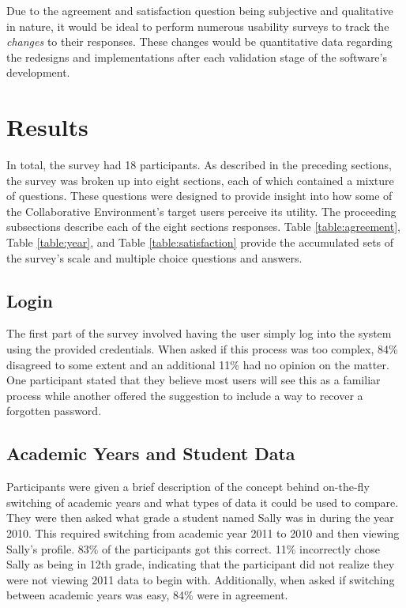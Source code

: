 Due to the agreement and satisfaction question being subjective and qualitative in nature, it would be ideal to perform numerous usability surveys to track the \emph{changes} to their responses. These changes would be quantitative data regarding the redesigns and implementations after each validation stage of the software's development.

\section{Results}
In total, the survey had 18 participants. As described in the preceding sections, the survey was broken up into eight sections, each of which contained a mixture of questions. These questions were designed to provide insight into how some of the Collaborative Environment's target users perceive its utility. The proceeding subsections describe each of the eight sections responses. Table \ref{table:agreement}, Table \ref{table:year}, and Table \ref{table:satisfaction} provide the accumulated sets of the survey's scale and multiple choice questions and answers.

\subsection*{Login}
The first part of the survey involved having the user simply log into the system using the provided credentials. When asked if this process was too complex, 84\% disagreed to some extent and an additional 11\% had no opinion on the matter. One participant stated that they believe most users will see this as a familiar process while another offered the suggestion to include a way to recover a forgotten password.

\subsection*{Academic Years and Student Data}
Participants were given a brief description of the concept behind on-the-fly switching of academic years and what types of data it could be used to compare. They were then asked what grade a student named Sally was in during the year 2010. This required switching from academic year 2011 to 2010 and then viewing Sally's profile. 83\% of the participants got this correct. 11\% incorrectly chose Sally as being in 12th grade, indicating that the participant did not realize they were not viewing 2011 data to begin with. Additionally, when asked if switching between academic years was easy, 84\% were in agreement.

